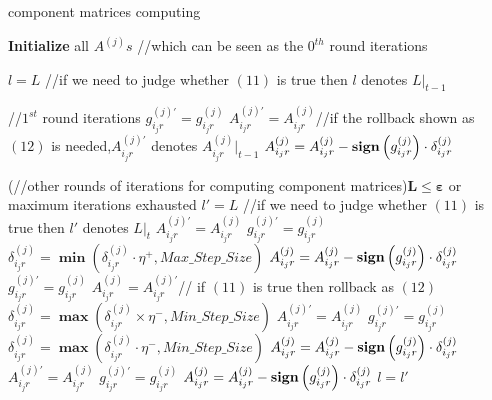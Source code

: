 \documentclass[8pt,twocolumn]{ctexart}
\begin{document}
  
	
	\begin{algorithm}  
		\caption{component matrices computing}  
		\LinesNumbered  
		\textbf{Initialize} all $A^{(j)}s$ //which can be seen as the $0^{th}$ round iterations\;  
		
		{$l$\hspace*{-1pt}\textacutedbl}$=L$ //if we need to judge whether $(11)$ is true then {$l$\hspace*{-1pt}\textacutedbl} denotes $L|_{t-1}$\;  
		
		{//$1^{st}$ round iterations\;  
			$g_{i_jr}^{(j)'}=g_{i_jr}^{(j)}$\;  
			$A_{i_jr}^{(j)'}=A_{i_jr}^{(j)}$//if the rollback shown as $(12)$ is needed,$A_{i_jr}^{(j)'}$ denotes $A_{i_jr}^{(j)}|_{t-1}$\;  
			$A_{i_jr}^{(j)}=A_{i_jr}^{(j)}-\mathrm{{\bf sign}}\left(g_{i_jr}^{(j)}\right)\cdot\delta_{i_jr}^{(j)}$\;  
		}  
		
		\Repeat(//other rounds of iterations for computing component matrices){$\bm{L\le \varepsilon}$ or maximum iterations exhausted}  
		{  
			$l'=L$ //if we need to judge whether $(11)$ is true then $l'$ denotes $L|_t$\;  
			{  
				{  
					$A_{i_jr}^{(j)'}=A_{i_jr}^{(j)} $\;  
					$g_{i_jr}^{(j)'}=g_{i_jr}^{(j)} $\;  
					$\delta_{i_jr}^{(j)}=\bm{\min}\left(\delta_{i_jr}^{(j)}\cdot\eta^{+},Max\_Step\_Size\right)$\;  
					$A_{i_jr}^{(j)}=A_{i_jr}^{(j)}-\mathrm{{\bf sign}}\left(g_{i_jr}^{(j)}\right)\cdot\delta_{i_jr}^{(j)}$\;  
				}  
				{  
					{  
						$g_{i_jr}^{(j)'}=g_{i_jr}^{(j)}$\;  
						$A_{i_jr}^{(j)}=A_{i_jr}^{(j)'}$// if $(11)$ is true then rollback as $(12)$\;  
						$\delta_{i_jr}^{(j)}=\bm{\max}\left(\delta_{i_jr}^{(j)}\times\eta^{-},Min\_Step\_Size\right)$\;  
					}  
					\Else  
					{  
						$A_{i_jr}^{(j)'}=A_{i_jr}^{(j)} $\;  
						$g_{i_jr}^{(j)'}=g_{i_jr}^{(j)} $\;  
						$\delta_{i_jr}^{(j)}=\bm{\max}\left(\delta_{i_jr}^{(j)}\cdot\eta^{-},Min\_Step\_Size\right)$\;  
						$A_{i_jr}^{(j)}=A_{i_jr}^{(j)}-\mathrm{{\bf sign}}\left(g_{i_jr}^{(j)}\right)\cdot\delta_{i_jr}^{(j)}$\;  
					}  
				}  
				\Else  
				{  
					$A_{i_jr}^{(j)'}=A_{i_jr}^{(j)} $\;  
					$g_{i_jr}^{(j)'}=g_{i_jr}^{(j)} $\;  
					$A_{i_jr}^{(j)}=A_{i_jr}^{(j)}-\mathrm{{\bf sign}}\left(g_{i_jr}^{(j)}\right)\cdot\delta_{i_jr}^{(j)}$\;  
				}  
			}  
			$l$\hspace*{-1pt}\textacutedbl$=l'$\;  
		}  
	\end{algorithm}  
\end{document}
